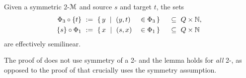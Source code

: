 
\begin{lemma} \label{lem:compbackfor}
Given a symmetric 2-\cm $\mathcal{M}$ and source $s$ and target $t$, the sets
\begin{alignat*}{5}
    \Phi_3 \circ \{t\} \ &:= \  \{\,y \ \mid \ (y,t) &&\in \Phi_3\,\} \ &&\subseteq \ Q \times \mathbb{N}, \\
    \{s\} \circ \Phi_1 \ &:= \  \{\,x \ \mid \ (s,x) &&\in \Phi_1\,\} \ &&\subseteq \ Q \times \mathbb{N}
\end{alignat*}
are effectively semilinear.
\end{lemma}


\begin{remark}
The proof of  does not use symmetry of a 2-\cm
and the lemma holds for \emph{all} 2-, as opposed to
the proof of  that crucially uses the symmetry assumption.
\end{remark}

